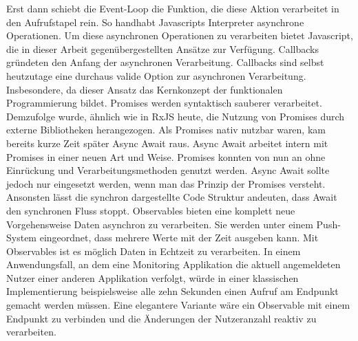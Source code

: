 \noindent
Erst dann schiebt die Event-Loop die Funktion, die diese Aktion verarbeitet in den Aufrufstapel rein. So handhabt Javascripts Interpreter asynchrone Operationen. Um diese asynchronen Operationen zu verarbeiten bietet Javascript, die in dieser Arbeit gegenübergestellten Ansätze zur Verfügung. Callbacks gründeten den Anfang der asynchronen Verarbeitung. Callbacks sind selbst heutzutage eine durchaus valide Option zur asynchronen Verarbeitung. Insbesondere, da dieser Ansatz das Kernkonzept der funktionalen Programmierung bildet. Promises werden syntaktisch \glqq sauberer\grqq{} verarbeitet. Demzufolge wurde, ähnlich wie in RxJS heute, die Nutzung von Promises durch externe Bibliotheken herangezogen. Als Promises nativ nutzbar waren, kam bereits kurze Zeit später Async Await raus. Async Await arbeitet intern mit Promises in einer neuen Art und Weise. Promises konnten von nun an ohne Einrückung und Verarbeitungsmethoden genutzt werden. Async Await sollte jedoch nur eingesetzt werden, wenn man das Prinzip der Promises versteht. Ansonsten lässt die synchron dargestellte Code Struktur andeuten, dass Await den synchronen Fluss stoppt. Observables bieten eine komplett neue Vorgehensweise Daten asynchron zu verarbeiten. Sie werden unter einem Push-System eingeordnet, dass mehrere Werte mit der Zeit ausgeben kann. Mit Observables ist es möglich Daten in Echtzeit zu verarbeiten. In einem Anwendungsfall, an dem eine Monitoring Applikation die aktuell angemeldeten Nutzer einer anderen Applikation verfolgt, würde in einer klassischen Implementierung beispielsweise alle zehn Sekunden einen Aufruf am Endpunkt gemacht werden müssen. Eine elegantere Variante wäre ein Observable mit einem Endpunkt zu verbinden und die Änderungen der Nutzeranzahl reaktiv zu verarbeiten.
